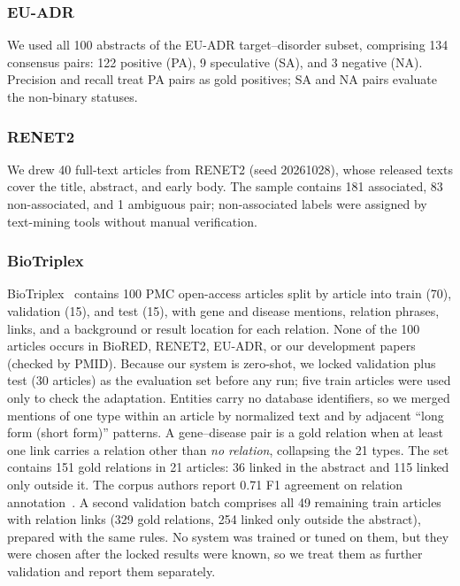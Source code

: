 \documentclass[preprint,10pt,letterpaper]{elsarticle}
\begin{document}
\subsubsection{EU-ADR}
We used all 100 abstracts of the EU-ADR target--disorder subset, comprising 134 consensus pairs: 122 positive (PA), 9 speculative (SA), and 3 negative (NA). Precision and recall treat PA pairs as gold positives; SA and NA pairs evaluate the non-binary statuses.

\subsubsection{RENET2}
We drew 40 full-text articles from RENET2 (seed 20261028), whose released texts cover the title, abstract, and early body. The sample contains 181 associated, 83 non-associated, and 1 ambiguous pair; non-associated labels were assigned by text-mining tools without manual verification.

\subsubsection{BioTriplex}
BioTriplex~\cite{collins2026biotriplex} contains 100 PMC open-access articles split by article into train (70), validation (15), and test (15), with gene and disease mentions, relation phrases, links, and a background or result location for each relation. None of the 100 articles occurs in BioRED, RENET2, EU-ADR, or our development papers (checked by PMID). Because our system is zero-shot, we locked validation plus test (30 articles) as the evaluation set before any run; five train articles were used only to check the adaptation. Entities carry no database identifiers, so we merged mentions of one type within an article by normalized text and by adjacent ``long form (short form)'' patterns. A gene--disease pair is a gold relation when at least one link carries a relation other than \emph{no relation}, collapsing the 21 types. The set contains 151 gold relations in 21 articles: 36 linked in the abstract and 115 linked only outside it. The corpus authors report 0.71 F1 agreement on relation annotation~\cite{collins2026biotriplex}. A second validation batch comprises all 49 remaining train articles with relation links (329 gold relations, 254 linked only outside the abstract), prepared with the same rules. No system was trained or tuned on them, but they were chosen after the locked results were known, so we treat them as further validation and report them separately.
\end{document}
